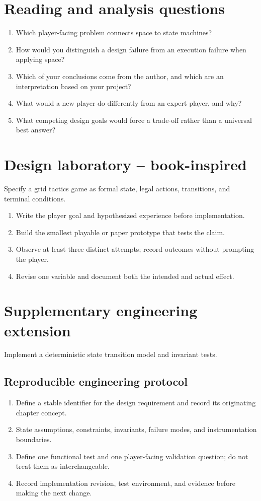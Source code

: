\documentclass[11pt]{article}
\begin{document}
\section{Reading and analysis questions}
\begin{enumerate}
\item Which player-facing problem connects space to state machines?
\item How would you distinguish a design failure from an execution failure when applying space?
\item Which of your conclusions come from the author, and which are an interpretation based on your project?
\item What would a new player do differently from an expert player, and why?
\item What competing design goals would force a trade-off rather than a universal best answer?
\end{enumerate}

\section{Design laboratory -- book-inspired}
Specify a grid tactics game as formal state, legal actions, transitions, and terminal conditions.

\begin{enumerate}
\item Write the player goal and hypothesized experience before implementation.
\item Build the smallest playable or paper prototype that tests the claim.
\item Observe at least three distinct attempts; record outcomes without prompting the player.
\item Revise one variable and document both the intended and actual effect.
\end{enumerate}

\section{Supplementary engineering extension}
Implement a deterministic state transition model and invariant tests.


\subsection{Reproducible engineering protocol}
\begin{enumerate}
\item Define a stable identifier for the design requirement and record its originating chapter concept.
\item State assumptions, constraints, invariants, failure modes, and instrumentation boundaries.
\item Define one functional test and one player-facing validation question; do not treat them as interchangeable.
\item Record implementation revision, test environment, and evidence before making the next change.
\end{enumerate}
\end{document}
